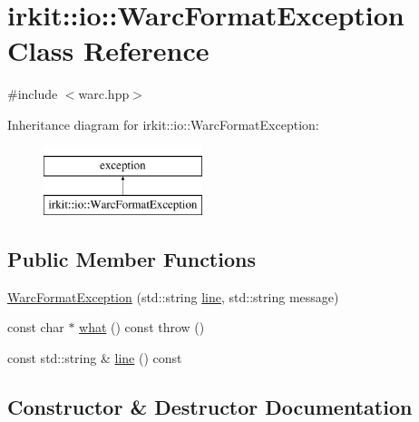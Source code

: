 \hypertarget{classirkit_1_1io_1_1WarcFormatException}{}\section{irkit\+:\+:io\+:\+:Warc\+Format\+Exception Class Reference}
\label{classirkit_1_1io_1_1WarcFormatException}


{\ttfamily \#include $<$warc.\+hpp$>$}

Inheritance diagram for irkit\+:\+:io\+:\+:Warc\+Format\+Exception\+:\begin{figure}[H]
\begin{center}
\leavevmode
\includegraphics[height=2.000000cm]{classirkit_1_1io_1_1WarcFormatException}
\end{center}
\end{figure}
\subsection*{Public Member Functions}
\begin{DoxyCompactItemize}
\item 
\mbox{\hyperlink{classirkit_1_1io_1_1WarcFormatException_a0624a8c91ca87a860faadde0cb14ff25}{Warc\+Format\+Exception}} (std\+::string \mbox{\hyperlink{classirkit_1_1io_1_1WarcFormatException_a7f2f93abda720fb08f9b367cab16d354}{line}}, std\+::string message)
\item 
const char $\ast$ \mbox{\hyperlink{classirkit_1_1io_1_1WarcFormatException_afbeda38d9f865635608b61a0e144c677}{what}} () const  throw ()
\item 
const std\+::string \& \mbox{\hyperlink{classirkit_1_1io_1_1WarcFormatException_a7f2f93abda720fb08f9b367cab16d354}{line}} () const
\end{DoxyCompactItemize}


\subsection{Constructor \& Destructor Documentation}
\mbox{\label{classirkit_1_1io_1_1WarcFormatException_a0624a8c91ca87a860faadde0cb14ff25}} 
